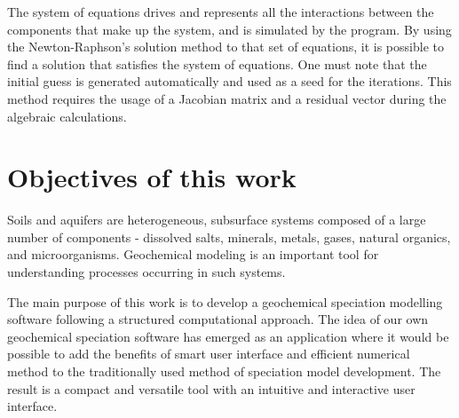 
The system of equations drives and represents all the interactions between the components that make up the system, and is simulated by the program. By using the Newton-Raphson's solution method to that set of equations, it is possible to find a solution that satisfies the system of equations.  One must note that the initial guess is generated automatically and used as a seed for the iterations. 
This method requires the usage of a Jacobian matrix and a residual vector during the algebraic calculations. 



\section{Objectives of this work}


Soils and aquifers are heterogeneous, subsurface systems composed of a large number of components - dissolved salts, minerals, metals, gases, natural organics, and microorganisms. Geochemical modeling is an important tool for understanding processes occurring in such systems. 

The main purpose of this work is to develop a geochemical speciation modelling software following a structured computational approach. The idea of our own geochemical speciation software has emerged as an application where it would be possible to add the benefits of smart user interface and efficient numerical method to the traditionally used method of speciation model development. The result is a compact and versatile tool with an intuitive and interactive user interface.

